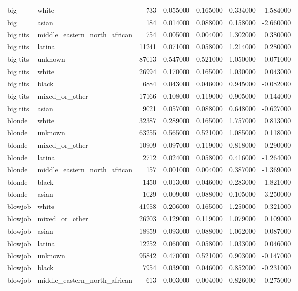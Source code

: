 \begin{tabular}{llrrrrr}
big & white & 733 & 0.055000 & 0.165000 & 0.334000 & -1.584000 \\
big & asian & 184 & 0.014000 & 0.088000 & 0.158000 & -2.660000 \\
big tits & middle_eastern_north_african & 754 & 0.005000 & 0.004000 & 1.302000 & 0.380000 \\
big tits & latina & 11241 & 0.071000 & 0.058000 & 1.214000 & 0.280000 \\
big tits & unknown & 87013 & 0.547000 & 0.521000 & 1.050000 & 0.071000 \\
big tits & white & 26994 & 0.170000 & 0.165000 & 1.030000 & 0.043000 \\
big tits & black & 6884 & 0.043000 & 0.046000 & 0.945000 & -0.082000 \\
big tits & mixed_or_other & 17166 & 0.108000 & 0.119000 & 0.905000 & -0.144000 \\
big tits & asian & 9021 & 0.057000 & 0.088000 & 0.648000 & -0.627000 \\
blonde & white & 32387 & 0.289000 & 0.165000 & 1.757000 & 0.813000 \\
blonde & unknown & 63255 & 0.565000 & 0.521000 & 1.085000 & 0.118000 \\
blonde & mixed_or_other & 10909 & 0.097000 & 0.119000 & 0.818000 & -0.290000 \\
blonde & latina & 2712 & 0.024000 & 0.058000 & 0.416000 & -1.264000 \\
blonde & middle_eastern_north_african & 157 & 0.001000 & 0.004000 & 0.387000 & -1.369000 \\
blonde & black & 1450 & 0.013000 & 0.046000 & 0.283000 & -1.821000 \\
blonde & asian & 1029 & 0.009000 & 0.088000 & 0.105000 & -3.250000 \\
blowjob & white & 41958 & 0.206000 & 0.165000 & 1.250000 & 0.321000 \\
blowjob & mixed_or_other & 26203 & 0.129000 & 0.119000 & 1.079000 & 0.109000 \\
blowjob & asian & 18959 & 0.093000 & 0.088000 & 1.062000 & 0.087000 \\
blowjob & latina & 12252 & 0.060000 & 0.058000 & 1.033000 & 0.046000 \\
blowjob & unknown & 95842 & 0.470000 & 0.521000 & 0.903000 & -0.147000 \\
blowjob & black & 7954 & 0.039000 & 0.046000 & 0.852000 & -0.231000 \\
blowjob & middle_eastern_north_african & 613 & 0.003000 & 0.004000 & 0.826000 & -0.275000 \\

\end{tabular}
